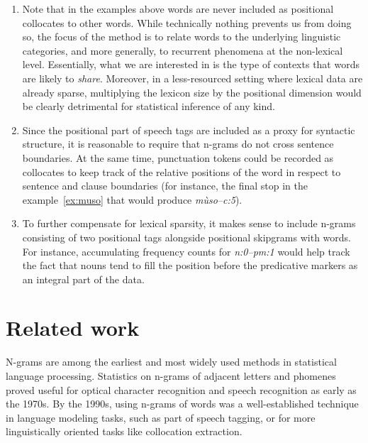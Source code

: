 \documentclass[12pt]{article}
\begin{document}
\begin{enumerate}
\item Note that in the examples above words are never included as
  positional collocates to other words. While technically nothing
  prevents us from doing so, the focus of the method is to relate
  words to the underlying linguistic categories, and more generally,
  to recurrent phenomena at the non-lexical level.  Essentially, what
  we are interested in is the type of contexts that words are likely
  to \textit{share}.  Moreover, in a less-resourced setting where
  lexical data are already sparse, multiplying the lexicon size by the
  positional dimension would be clearly detrimental for statistical
  inference of any kind.
\item Since the positional part of speech tags are included as a proxy
  for syntactic structure, it is reasonable to require that n-grams do
  not cross sentence boundaries.  At the same time, punctuation tokens
  could be recorded as collocates to keep track of the relative
  positions of the word in respect to sentence and clause boundaries
  (for instance, the final stop in the example~\ref{ex:muso} that would
  produce \textit{mùso--c:5}).
\item To further compensate for lexical sparsity, it makes sense to
  include n-grams consisting of two positional tags alongside
  positional skipgrams with words. For instance, accumulating
  frequency counts for \textit{n:0--pm:1} would help track the
  fact that nouns tend to fill the position before the predicative
  markers as an integral part of the data.
\end{enumerate} 


\section{Related work}

N-grams are among the earliest and most widely used methods in 
statistical language processing.  Statistics on n-grams of adjacent
letters and phomenes proved useful for optical character recognition
and speech recognition as early as the 1970s. By
the 1990s, using n-grams of words was a well-established technique in
language modeling tasks, such as part of speech
tagging, or for more linguistically
oriented tasks like collocation extraction.
\end{document}
